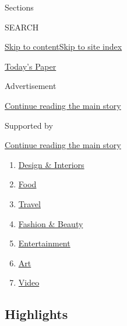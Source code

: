 Sections

SEARCH

\protect\hyperlink{site-content}{Skip to
content}\protect\hyperlink{site-index}{Skip to site index}

\href{https://myaccount.nytimes.com/auth/login?response_type=cookie\&client_id=vi}{}

\href{https://www.nytimes.com/section/todayspaper}{Today's Paper}

Advertisement

\protect\hyperlink{after-top}{Continue reading the main story}

Supported by

\protect\hyperlink{after-sponsor}{Continue reading the main story}

\begin{enumerate}
\def\labelenumi{\arabic{enumi}.}
\tightlist
\item
  \href{/section/t-magazine/design}{Design \& Interiors}
\item
  \href{/section/t-magazine/food}{Food}
\item
  \href{/section/t-magazine/travel}{Travel}
\item
  \href{/section/t-magazine/fashion}{Fashion \& Beauty}
\item
  \href{/section/t-magazine/entertainment}{Entertainment}
\item
  \href{/section/t-magazine/art}{Art}
\item
  \href{/video/t-magazine}{Video}
\end{enumerate}

\hypertarget{highlights}{%
\subsection{Highlights}\label{highlights}}

